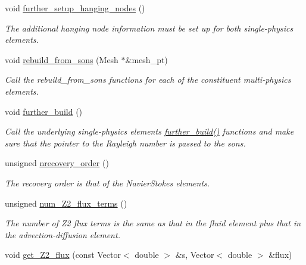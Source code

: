 \begin{DoxyCompactItemize}
void \hyperlink{classoomph_1_1RefineableBuoyantQCrouzeixRaviartElement_ab0a823598e014557e7d2ef2d533972d1}{further\+\_\+setup\+\_\+hanging\+\_\+nodes} ()
\begin{DoxyCompactList}\small\item\em The additional hanging node information must be set up for both single-\/physics elements. \end{DoxyCompactList}\item 
void \hyperlink{classoomph_1_1RefineableBuoyantQCrouzeixRaviartElement_a00e5ff46d718e47374a3d1dc282f419c}{rebuild\+\_\+from\+\_\+sons} (Mesh $\ast$\&mesh\+\_\+pt)
\begin{DoxyCompactList}\small\item\em Call the rebuild\+\_\+from\+\_\+sons functions for each of the constituent multi-\/physics elements. \end{DoxyCompactList}\item 
void \hyperlink{classoomph_1_1RefineableBuoyantQCrouzeixRaviartElement_a60d622f02595901b5f3ad830de915471}{further\+\_\+build} ()
\begin{DoxyCompactList}\small\item\em Call the underlying single-\/physics element\textquotesingle{}s \hyperlink{classoomph_1_1RefineableBuoyantQCrouzeixRaviartElement_a60d622f02595901b5f3ad830de915471}{further\+\_\+build()} functions and make sure that the pointer to the Rayleigh number is passed to the sons. \end{DoxyCompactList}\item 
unsigned \hyperlink{classoomph_1_1RefineableBuoyantQCrouzeixRaviartElement_a18e7035500add323a8d5ce921c9c1b8a}{nrecovery\+\_\+order} ()
\begin{DoxyCompactList}\small\item\em The recovery order is that of the Navier\+Stokes elements. \end{DoxyCompactList}\item 
unsigned \hyperlink{classoomph_1_1RefineableBuoyantQCrouzeixRaviartElement_a630b9aa6c5cf924d32996e89ed230175}{num\+\_\+\+Z2\+\_\+flux\+\_\+terms} ()
\begin{DoxyCompactList}\small\item\em The number of Z2 flux terms is the same as that in the fluid element plus that in the advection-\/diffusion element. \end{DoxyCompactList}\item 
void \hyperlink{classoomph_1_1RefineableBuoyantQCrouzeixRaviartElement_a1b78fb6b311b89cff1b57fcaacd924d7}{get\+\_\+\+Z2\+\_\+flux} (const Vector$<$ double $>$ \&s, Vector$<$ double $>$ \&flux)

\end{DoxyCompactItemize}
